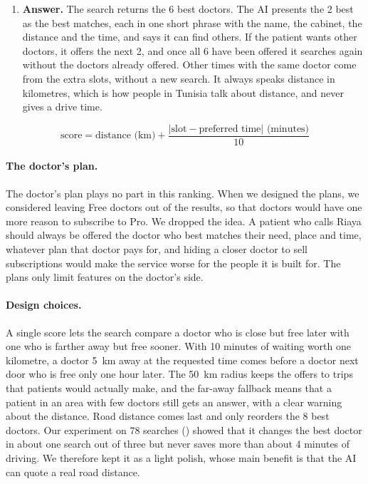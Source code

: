 \begin{enumerate}
    \item \textbf{Answer.} The search returns the 6 best doctors. The AI presents the 2 best as the best matches, each in one short phrase with the name, the cabinet, the distance and the time, and says it can find others. If the patient wants other doctors, it offers the next 2, and once all 6 have been offered it searches again without the doctors already offered. Other times with the same doctor come from the extra slots, without a new search. It always speaks distance in kilometres, which is how people in Tunisia talk about distance, and never gives a drive time.
\end{enumerate}

\[
\text{score} = \text{distance (km)} + \frac{\lvert \text{slot} - \text{preferred time} \rvert \text{ (minutes)}}{10}
\]

\paragraph{The doctor's plan.} The doctor's plan plays no part in this ranking. When we designed the plans, we considered leaving Free doctors out of the results, so that doctors would have one more reason to subscribe to Pro. We dropped the idea. A patient who calls Riaya should always be offered the doctor who best matches their need, place and time, whatever plan that doctor pays for, and hiding a closer doctor to sell subscriptions would make the service worse for the people it is built for. The plans only limit features on the doctor's side.

\paragraph{Design choices.} A single score lets the search compare a doctor who is close but free later with one who is farther away but free sooner. With 10 minutes of waiting worth one kilometre, a doctor 5~km away at the requested time comes before a doctor next door who is free only one hour later. The 50~km radius keeps the offers to trips that patients would actually make, and the far-away fallback means that a patient in an area with few doctors still gets an answer, with a clear warning about the distance. Road distance comes last and only reorders the 8 best doctors. Our experiment on 78 searches () showed that it changes the best doctor in about one search out of three but never saves more than about 4 minutes of driving. We therefore kept it as a light polish, whose main benefit is that the AI can quote a real road distance.

